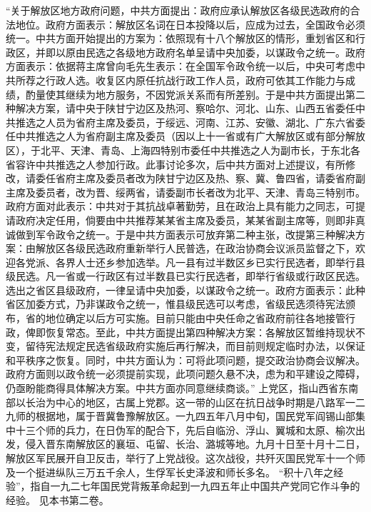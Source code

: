 \begin{maonote}
“关于解放区地方政府问题，中共方面提出：政府应承认解放区各级民选政府的合法地位。政府方面表示：解放区名词在日本投降以后，应成为过去，全国政令必须统一。中共方面开始提出的方案为：依照现有十八个解放区的情形，重划省区和行政区，并即以原由民选之各级地方政府名单呈请中央加委，以谋政令之统一。政府方面表示：依据蒋主席曾向毛先生表示：在全国军令政令统一以后，中央可考虑中共所荐之行政人选。收复区内原任抗战行政工作人员，政府可依其工作能力与成绩，酌量使其继续为地方服务，不因党派关系而有所差别。于是中共方面提出第二种解决方案，请中央于陕甘宁边区及热河、察哈尔、河北、山东、山西五省委任中共推选之人员为省府主席及委员，于绥远、河南、江苏、安徽、湖北、广东六省委任中共推选之人为省府副主席及委员（因以上十一省或有广大解放区或有部分解放区），于北平、天津、青岛、上海四特别市委任中共推选之人为副市长，于东北各省容许中共推选之人参加行政。此事讨论多次，后中共方面对上述提议，有所修改，请委任省府主席及委员者改为陕甘宁边区及热、察、冀、鲁四省，请委省府副主席及委员者，改为晋、绥两省，请委副市长者改为北平、天津、青岛三特别市。政府方面对此表示：中共对于其抗战卓著勤劳，且在政治上具有能力之同志，可提请政府决定任用，倘要由中共推荐某某省主席及委员，某某省副主席等，则即非真诚做到军令政令之统一。于是中共方面表示可放弃第二种主张，改提第三种解决方案：由解放区各级民选政府重新举行人民普选，在政治协商会议派员监督之下，欢迎各党派、各界人士还乡参加选举。凡一县有过半数区乡已实行民选者，即举行县级民选。凡一省或一行政区有过半数县已实行民选者，即举行省级或行政区民选。选出之省区县级政府，一律呈请中央加委，以谋政令之统一。政府方面表示：此种省区加委方式，乃非谋政令之统一，惟县级民选可以考虑，省级民选须待宪法颁布，省的地位确定以后方可实施。目前只能由中央任命之省政府前往各地接管行政，俾即恢复常态。至此，中共方面提出第四种解决方案：各解放区暂维持现状不变，留待宪法规定民选省级政府实施后再行解决，而目前则规定临时办法，以保证和平秩序之恢复。同时，中共方面认为：可将此项问题，提交政治协商会议解决。政府方面则以政令统一必须提前实现，此项问题久悬不决，虑为和平建设之障碍，仍亟盼能商得具体解决方案。中共方面亦同意继续商谈。”
上党区，指山西省东南部以长治为中心的地区，古属上党郡。这一带的山区在抗日战争时期是八路军一二九师的根据地，属于晋冀鲁豫解放区。一九四五年八月中旬，国民党军阎锡山部集中十三个师的兵力，在日伪军的配合下，先后自临汾、浮山、翼城和太原、榆次出发，侵入晋东南解放区的襄垣、屯留、长治、潞城等地。九月十日至十月十二日，解放区军民展开自卫反击，举行了上党战役。这次战役，共歼灭国民党军十一个师及一个挺进纵队三万五千余人，生俘军长史泽波和师长多名。
“积十八年之经验”，指自一九二七年国民党背叛革命起到一九四五年止中国共产党同它作斗争的经验。
见本书第二卷。

\end{maonote}
